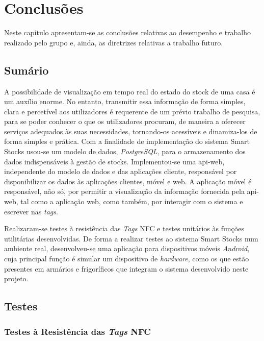 %
%
\chapter{Conclusões} \label{cap4}

Neste capítulo apresentam-se as conclusões relativas ao desempenho e trabalho realizado pelo grupo e, ainda, as diretrizes relativas a trabalho futuro. 

%
%
\section{Sumário}\label{sec41}

A possibilidade de visualização em tempo real do estado do stock de uma casa é um auxílio enorme.
No entanto, transmitir essa informação de forma simples, clara e percetível aos utilizadores é requerente de um prévio trabalho de pesquisa, para se poder conhecer o que os utilizadores procuram, de maneira a oferecer serviços adequados às suas necessidades, tornando-os acessíveis e dinamiza-los de forma simples e prática.
Com a finalidade de implementação do sistema Smart Stocks usou-se um modelo de dados, \textit{PostgreSQL}, para o armazenamento dos dados indispensáveis à gestão de stocks. Implementou-se uma \gls{api-web}, independente do modelo de dados e das aplicações cliente, responsável por disponibilizar os dados às aplicações clientes, móvel e web. A aplicação móvel é responsável, não só, por permitir a visualização da informação fornecida pela \gls{api-web}, tal como a aplicação web, como também, por interagir com o sistema e escrever nas \textit{tags}.

Realizaram-se testes à resistência das \textit{Tags} NFC e testes unitários às funções utilitárias desenvolvidas. De forma a realizar testes ao sistema Smart Stocks num ambiente real, desenvolveu-se uma aplicação para dispositivos móveis \textit{Android}, cuja principal função é simular um dispositivo de \textit{hardware}, como os que estão presentes em armários e frigoríficos que integram o sistema desenvolvido neste projeto.

%
%
\section{Testes}\label{sec42}

\subsection{Testes à Resistência das \textit{Tags} NFC}\label{subsec421}

